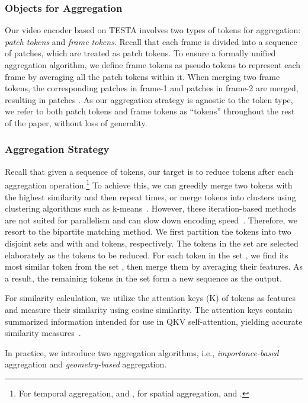 \documentclass[11pt]{article}
\newcommand{\modelname}{TESTA\xspace}
\begin{document}
\subsubsection{Objects for Aggregation}
\label{subsubsec:agg-obj}
Our video encoder based on \modelname involves two types of tokens for aggregation: \textit{patch tokens} and \textit{frame tokens}. Recall that each frame is divided into a sequence of patches, which are treated as patch tokens. To ensure a formally unified aggregation algorithm, we define frame tokens as pseudo tokens to represent each frame by averaging all the patch tokens within it.
When merging two frame tokens, the corresponding  patches  in frame-1 and  patches  in frame-2 are merged, resulting in  patches . 
As our aggregation strategy is agnostic to the token type, we refer to both patch tokens and frame tokens as ``tokens'' throughout the rest of the paper, without loss of generality.~ 

\subsubsection{Aggregation Strategy}
Recall that given a sequence of  tokens, our target is to reduce  tokens after each aggregation operation.\footnote{For temporal aggregation,  and , for spatial aggregation,  and .} 
To achieve this, we can greedily merge two tokens with the highest similarity and then repeat  times, or merge  tokens into  clusters using clustering algorithms such as k-means~\citep{Lloyd1982LeastSQ}. 
However, these iteration-based methods are not suited for parallelism and can slow down encoding speed~\citep{Bolya2022TokenMY}. 
Therefore, we resort to the bipartite matching method. 
We first partition the  tokens into two disjoint sets  and  with  and  tokens, respectively. The  tokens in the set  are selected elaborately as the tokens to be reduced. 
For each token in the set , we find its most similar token from the set , then merge them by averaging their features. As a result, the remaining  tokens in the set  form a new sequence as the output.  

For similarity calculation, we utilize the attention keys (K) of tokens as features and measure their similarity using cosine similarity. The attention keys contain summarized information intended for use in QKV self-attention, yielding accurate similarity measures~\citep{Bolya2022TokenMY}.


In practice, we introduce two aggregation algorithms, i.e., \textit{importance-based} aggregation and \textit{geometry-based} aggregation. 
\end{document}
